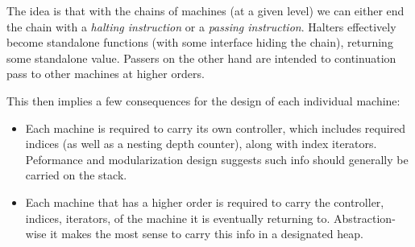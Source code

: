 \documentclass[twoside]{article}
\begin{document}
The idea is that with the chains of machines (at a given level) we can either end the chain with
a \emph{halting instruction} or a \emph{passing instruction}. Halters effectively become standalone functions
(with some interface hiding the chain), returning some standalone value. Passers on the other hand are intended
to continuation pass to other machines at higher orders.

This then implies a few consequences for the design of each individual machine:

\begin{itemize}
\item Each machine is required to carry its own controller, which includes required indices (as well as a nesting
depth counter), along with index iterators. Peformance and modularization design suggests such info should generally
be carried on the stack.
\item Each machine that has a higher order is required to carry the controller, indices, iterators, of the machine
it is eventually returning to. Abstraction-wise it makes the most sense to carry this info in a designated heap.
\end{itemize}

\newpage
\end{document}
